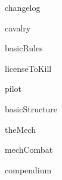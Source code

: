 \documentclass{book}
\begin{document}
{changelog}  
\newpage
        
\setcounter{tocdepth}{7}

\tableofcontents
\newpage


{cavalry}    
\newpage

{basicRules}    
\newpage



{licenseToKill}    
\newpage


{pilot}    
\newpage

{basicStructure}    
\newpage



{theMech}    
\newpage






{mechCombat}    
\newpage











{compendium} 
\newpage
\end{document}
